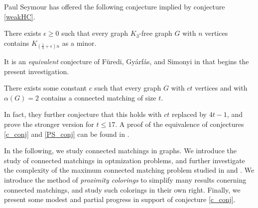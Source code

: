 Paul Seymour has offered the following conjecture implied by conjecture \ref{weakHC}.
\begin{conj}
	There exists $\epsilon \geq 0$ such that every graph $K_3$-free graph $G$ with $n$ vertices contains $K_{(\frac{1}{3} + \epsilon)n}$ as a minor.
\label{PS_conj}
\end{conj}
\noindent It is an \textit{equivalent} conjecture of F\"{u}redi, Gy{\'a}rf{\'a}s, and Simonyi in \cite{FGS} that begins the present investigation.
\begin{conj}	
	There exists some constant $c$ such that every graph $G$ with $ct$ vertices and with $\alpha(G) = 2$ contains a connected matching of size $t$.
\label{c_conj}
\end{conj}  
In fact, they further conjecture that this holds with $ct$ replaced by $4t-1$, and prove the stronger version for $t \leq 17$. A proof of the equivalence of conjectures \ref{c_conj} and \ref{PS_conj} can be found in \cite{DandMimprove}.

In the following, we study connected matchings in graphs.  We introduce the study of connected matchings in optmization problems, and further investigate the complexity of the maximum connected matching problem studied in \cite{Spec_case} and \cite{K_Cam}.  We introduce the method of \textit{proximity colorings} to simplify many results conerning connected matchings, and study such colorings in their own right.  Finally, we present some modest and partial progress in support of conjecture \ref{c_conj}.  

